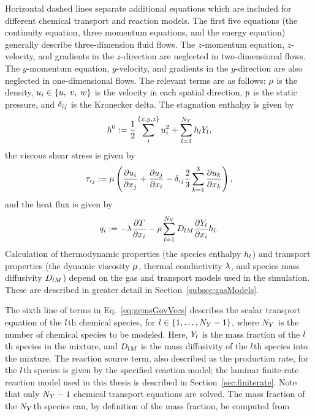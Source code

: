 Horizontal dashed lines separate additional equations which are included for different chemical transport and reaction models. The first five equations (the continuity equation, three momentum equations, and the energy equation) generally describe three-dimension fluid flows. The $z$-momentum equation, $z$-velocity, and gradients in the $z$-direction are neglected in two-dimensional flows. The $y$-momentum equation, $y$-velocity, and gradients in the $y$-direction are also neglected in one-dimensional flows. The relevant terms are as follows: $\rho$ is the density, $u_{i} \in \{u, \; v, \; w\}$ is the velocity in each spatial direction, $p$ is the static pressure, and $\delta_{i j}$ is the Kronecker delta. The stagnation enthalpy is given by
\begin{equation}\label{eq:stagEnth}
	h^0 := \frac{1}{2} \sum_{i}^{\{x,y,z\}} u_{i}^2 + \sum_{l = 1}^{N_Y} h_{l} Y_{l},
\end{equation}
the viscous shear stress is given by
\begin{equation}\label{eq:shearStress}
	\tau_{i j} := \mu \left( \frac{\partial u_{i}}{\partial x_{j}} + \frac{\partial u_{j}}{\partial x_{i}} - \delta_{i j} \frac{2}{3} \sum_{k=1}^3 \frac{\partial u_{k}}{\partial x_{k}} \right),
\end{equation}
and the heat flux is given by
\begin{equation}\label{eq:heatFlux}
	q_{i} := -\lambda \frac{\partial T}{\partial x_{i}} - \rho \sum_{l = 1}^{N_Y} D_{l M} \frac{\partial Y_{l}}{\partial x_{i}} h_{l}.
\end{equation}
Calculation of thermodynamic properties (the species enthalpy $h_{l}$) and transport properties (the dynamic viscosity $\mu$, thermal conductivity $\lambda$, and species mass diffusivity $D_{l M}$) depend on the gas and transport models used in the simulation. These are described in greater detail in Section~\ref{subsec:gasModels}.

The sixth line of terms in Eq.~\ref{eq:gemsGovVecs} describes the scalar transport equation of the $l$th chemical species, for $l \in \{1, \hdots, N_Y - 1\}$, where $N_Y$ is the number of chemical species to be modeled. Here, $Y_{l}$ is the mass fraction of the $l$th species in the mixture, and $D_{l M}$ is the mass diffusivity of the $l$th species into the mixture. The reaction source term, also described as the production rate, for the $l$th species is given by the specified reaction model; the laminar finite-rate reaction model used in this thesis is described in Section~\ref{sec:finiterate}. Note that only $N_Y - 1$ chemical transport equations are solved. The mass fraction of the $N_Y$th species can, by definition of the mass fraction, be computed from

